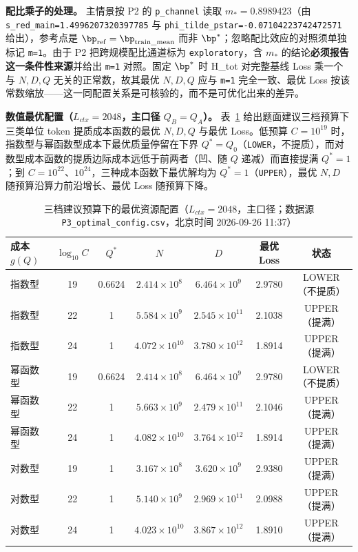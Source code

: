 \textbf{配比乘子的处理。} 主情景按 P2 的 \texttt{p\_channel} 读取 $m_*=0.8989423$（由 \texttt{s\_red\_main=1.4996207320397785} 与 \texttt{phi\_tilde\_pstar=-0.07104223742472571} 给出），参考点是 $\bp_{\rm ref}=\bp_{\rm train\_mean}$ 而非 $\bp^*$；忽略配比效应的对照须单独标记 \texttt{m=1}。由于 P2 把跨规模配比通道标为 \texttt{exploratory}，含 $m_*$ 的结论\textbf{必须报告这一条件性来源}并给出 \texttt{m=1} 对照。固定 $\bp^*$ 时 H\_tot 对完整基线 Loss 乘一个与 $N,D,Q$ 无关的正常数，故其最优 $N,D,Q$ 应与 \texttt{m=1} 完全一致、最优 Loss 按该常数缩放——这一同配置关系是可核验的，而不是可优化出来的差异。

\textbf{数值最优配置（$L_{ctx}=2048$，主口径 $Q_B=Q_A$）。} 表~\ref{tab:q3opt} 给出题面建议三档预算下三类单位 token 提质成本函数的最优 $N,D,Q$ 与最优 Loss。低预算 $C=10^{19}$ 时，指数型与幂函数型成本下最优质量停留在下界 $Q^*=Q_0$（\texttt{LOWER}，不提质），而对数型成本函数的提质边际成本远低于前两者（凹、随 $Q$ 递减）而直接提满 $Q^*=1$；到 $C=10^{22}$、$10^{24}$，三种成本函数下最优解均为 $Q^*=1$（\texttt{UPPER}），最优 $N,D$ 随预算沿算力前沿增长、最优 Loss 随预算下降。

\begin{table}[H]
\centering\small
\caption{三档建议预算下的最优资源配置（$L_{ctx}=2048$，主口径；数据源 \texttt{P3\_optimal\_config.csv}，北京时间 2026-09-26 11:37）}
\label{tab:q3opt}
\begin{tabularx}{\textwidth}{@{}l c c c c c c@{}}
\toprule
成本 $g(Q)$ & $\log_{10}C$ & $Q^*$ & $N$ & $D$ & 最优 Loss & 状态 \\
\midrule
指数型 & 19 & 0.6624 & $2.414\times10^{8}$ & $6.464\times10^{9}$ & 2.9780 & LOWER（不提质）\\
指数型 & 22 & 1 & $5.584\times10^{9}$ & $2.545\times10^{11}$ & 2.1038 & UPPER（提满）\\
指数型 & 24 & 1 & $4.072\times10^{10}$ & $3.780\times10^{12}$ & 1.8914 & UPPER（提满）\\
幂函数型 & 19 & 0.6624 & $2.414\times10^{8}$ & $6.464\times10^{9}$ & 2.9780 & LOWER（不提质）\\
幂函数型 & 22 & 1 & $5.663\times10^{9}$ & $2.479\times10^{11}$ & 2.1046 & UPPER（提满）\\
幂函数型 & 24 & 1 & $4.082\times10^{10}$ & $3.764\times10^{12}$ & 1.8914 & UPPER（提满）\\
对数型 & 19 & 1 & $3.167\times10^{8}$ & $3.620\times10^{9}$ & 2.9380 & UPPER（提满）\\
对数型 & 22 & 1 & $5.140\times10^{9}$ & $2.969\times10^{11}$ & 2.0988 & UPPER（提满）\\
对数型 & 24 & 1 & $4.023\times10^{10}$ & $3.867\times10^{12}$ & 1.8910 & UPPER（提满）\\
\bottomrule
\end{tabularx}
\end{table}

